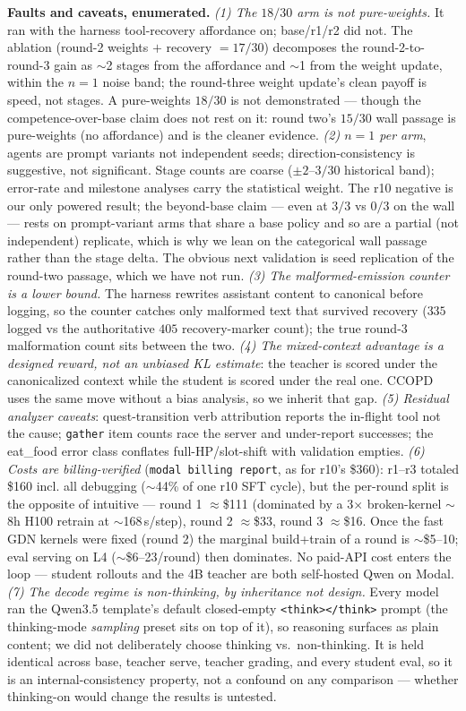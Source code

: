 \documentclass[11pt]{article}
\begin{document}
\textbf{Faults and caveats, enumerated.}
\emph{(1) The $18/30$ arm is not pure-weights.} It ran with the harness tool-recovery affordance
on; base/r1/r2 did not. The ablation (round-2 weights $+$ recovery $= 17/30$) decomposes the
round-2-to-round-3 gain as $\sim$2 stages from the affordance and $\sim$1 from the weight update,
within the $n{=}1$ noise band; the round-three weight update's clean payoff is speed, not stages. A
pure-weights $18/30$ is not demonstrated --- though the competence-over-base claim does not rest on
it: round two's $15/30$ wall passage is pure-weights (no affordance) and is the cleaner evidence. \emph{(2) $n{=}1$ per arm}, agents are prompt
variants not independent seeds; direction-consistency is suggestive, not significant. Stage
counts are coarse ($\pm 2$--$3/30$ historical band); error-rate and milestone analyses carry the
statistical weight. The r10 negative is our only powered result; the beyond-base claim --- even
at $3/3$ vs $0/3$ on the wall --- rests on prompt-variant arms that share a base policy and so
are a partial (not independent) replicate, which is why we lean on the categorical wall passage
rather than the stage delta. The obvious next validation is seed replication of the round-two
passage, which we have not run. \emph{(3) The malformed-emission counter is a lower bound.} The harness
rewrites assistant content to canonical before logging, so the counter catches only malformed text
that survived recovery ($335$ logged vs the authoritative $405$ recovery-marker count); the true
round-3 malformation count sits between the two. \emph{(4) The mixed-context advantage is a
designed reward, not an unbiased KL estimate}: the teacher is scored under the canonicalized
context while the student is scored under the real one. CCOPD~\cite{ccopd} uses the same move
without a bias analysis, so we inherit that gap. \emph{(5) Residual analyzer caveats}:
quest-transition verb attribution reports the in-flight tool not the cause; \texttt{gather} item
counts race the server and under-report successes; the eat\_food error class conflates
full-HP/slot-shift with validation empties. \emph{(6) Costs are billing-verified} (\texttt{modal
billing report}, as for r10's \$360): r1--r3 totaled \$160 incl. all debugging
($\sim$44\% of one r10 SFT cycle), but the per-round split is the opposite of intuitive ---
round 1 $\approx$\$111 (dominated by a 3$\times$ broken-kernel $\sim$8h H100 retrain at
$\sim$168\,s/step), round 2 $\approx$\$33, round 3 $\approx$\$16. Once the fast GDN kernels were
fixed (round 2) the marginal build+train of a round is $\sim$\$5--10; eval serving on L4
($\sim$\$6--23/round) then dominates. No paid-API cost enters the loop --- student rollouts and
the 4B teacher are both self-hosted Qwen on Modal. \emph{(7) The decode regime is non-thinking, by
inheritance not design.} Every model ran the Qwen3.5 template's default closed-empty
\texttt{<think></think>} prompt (the thinking-mode \emph{sampling} preset sits on top of it), so
reasoning surfaces as plain content; we did not deliberately choose thinking vs.\ non-thinking. It is
held identical across base, teacher serve, teacher grading, and every student eval, so it is an
internal-consistency property, not a confound on any comparison --- whether thinking-on would change
the results is untested.
\end{document}

